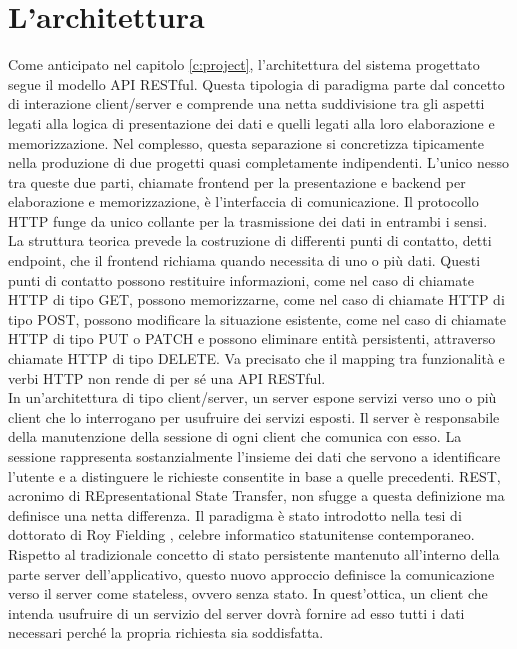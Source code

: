 \chapter{L'architettura}\label{c:architecture}

Come anticipato nel capitolo \ref{c:project}, l'architettura del sistema progettato segue il modello API RESTful.
Questa tipologia di paradigma parte dal concetto di interazione client/server e comprende una netta suddivisione tra gli aspetti legati alla logica di presentazione dei dati e quelli legati alla loro elaborazione e memorizzazione.
Nel complesso, questa separazione si concretizza tipicamente nella produzione di due progetti quasi completamente indipendenti.
L'unico nesso tra queste due parti, chiamate frontend per la presentazione e backend per elaborazione e memorizzazione, è l'interfaccia di comunicazione.
Il protocollo HTTP funge da unico collante per la trasmissione dei dati in entrambi i sensi.
\\
La struttura teorica prevede la costruzione di differenti punti di contatto, detti endpoint, che il frontend richiama quando necessita di uno o più dati.
Questi punti di contatto possono restituire informazioni, come nel caso di chiamate HTTP di tipo GET, possono memorizzarne, come nel caso di chiamate HTTP di tipo POST, possono modificare
la situazione esistente, come nel caso di chiamate HTTP di tipo PUT o PATCH e possono eliminare entità persistenti, attraverso chiamate HTTP di tipo DELETE.
Va precisato che il mapping tra funzionalità e verbi HTTP non rende di per sé una API RESTful.
\\
In un'architettura di tipo client/server, un server espone servizi verso uno o più client che lo interrogano per usufruire dei servizi esposti.
Il server è responsabile della manutenzione della sessione di ogni client che comunica con esso.
La sessione rappresenta sostanzialmente l'insieme dei dati che servono a identificare l'utente e a distinguere le richieste consentite in base a quelle precedenti.
REST, acronimo di REpresentational State Transfer, non sfugge a questa definizione ma definisce una netta differenza.
Il paradigma è stato introdotto nella tesi di dottorato di Roy Fielding \cite{fielding2000architectural}, celebre informatico statunitense contemporaneo.
Rispetto al tradizionale concetto di stato persistente mantenuto all'interno della parte server dell'applicativo, questo nuovo approccio definisce la comunicazione verso il server come stateless, ovvero senza stato.
In quest'ottica, un client che intenda usufruire di un servizio del server dovrà fornire ad esso tutti i dati necessari perché la propria richiesta sia soddisfatta.
